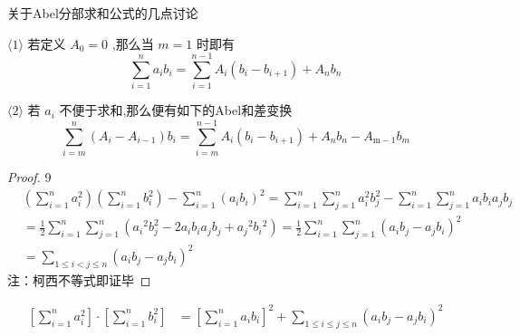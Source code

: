 \textsf{关于Abel分部求和公式的几点讨论}

\ensuremath{\langle 1 \rangle} 若定义 $A_0=0$ ,那么当 $m=1$ 时即有
\[
    \sum_{i=1}^n a_i b_i 
    = \sum_{i=1}^{n-1} A_i\left(b_i-b_{i+1}\right)+A_n b_n
\]

\ensuremath{\langle 2 \rangle} 若 $a_i$ 不便于求和,那么便有如下的Abel和差变换
\[
    \sum_{i=m}^n\left(A_i-A_{i-1}\right) b_i 
    = \sum_{i=m}^{n-1} A_i\left(b_i-b_{i+1}\right)+A_n b_n-A_{\mathrm{m}-1} b_m
\]

\clearpage

\begin{proof}\num{9}
    \begin{align*}
    &\left(\sum_{i=1}^n a_i^2\right)\left(\sum_{i=1}^n b_i^2\right)-\sum_{i=1}^n\left(a_i b_i\right)^2
        = \sum_{i=1}^n \sum_{j=1}^n a_i^2 b_j^2-\sum_{i=1}^n \sum_{j=1}^n a_i b_i a_j b_j \\
    & = \frac{1}{2} \sum_{i=1}^n \sum_{j=1}^n\left(a_i{ }^2 b_j^2-2 a_i b_i a_j b_j+a_j{ }^2 b_i{ }^2\right)
        =\frac{1}{2} \sum_{i=1}^n \sum_{j=1}^n\left(a_i b_j-a_j b_i\right)^2 \\
    & = \sum_{1 \leq i<j \leq n}\left(a_i b_j-a_j b_i\right)^2
    \end{align*}
    注：柯西不等式即证毕
\end{proof}

\begin{theorem}[拉格朗日恒等式]
    \begin{align}
        \left[
        \sum_{i=1}^{n}{a_i^2}
        \right]
        \cdot 
        \left[
        \sum_{i=1}^{n}{b_i^2}
        \right]
        &=
        \left[
        \sum_{i=1}^{n}{a_ib_i}
        \right]^2
        +
        \sum_{1\le i \le j \le n}({a_ib_j-a_jb_i})^2
    \end{align}
\end{theorem} 